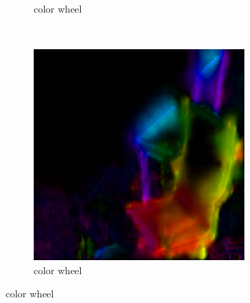 \begin{figure}[H]
\begin{subfigure}[t]{0.3\textwidth}
        \caption{color wheel}
    \end{subfigure}
    ~
    \begin{subfigure}[t]{0.3\textwidth}
        \centering
        \includegraphics[width=\textwidth]{55-global-step57865}
        \caption{color wheel}
    \end{subfigure}
    

\end{figure}
